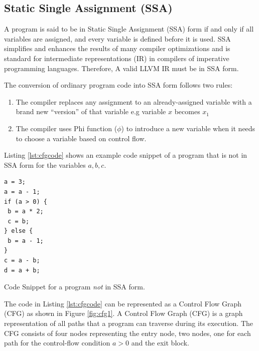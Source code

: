 \subsection{Static Single Assignment (SSA)}
A program is said to be in Static Single Assignment (SSA) \cite{ssa} form if and only if all variables are assigned, and every variable is defined before it is used. SSA simplifies and enhances the results of many compiler optimizations and is standard for intermediate representations (IR) in compilers of imperative programming languages. Therefore, A valid LLVM IR must be in SSA form.

\noindent The conversion of ordinary program code into SSA form follows two rules:
\begin{enumerate}
    \item The compiler replaces any assignment to an already-assigned variable with a brand new “version” of that variable e.g variable \texttt{\textbf{$x$}} becomes \texttt{\textbf{$x_1$}}
    \item The compiler uses Phi function ($\phi$) to introduce a new variable when it needs to choose a variable based on control flow.
\end{enumerate}

Listing \ref{lst:cfgcode} shows an example code snippet of a program that is not in SSA form for the variables $a, b, c$.

\begin{listing}[htbp]
\begin{verbatim}
a = 3;
a = a - 1;
if (a > 0) {
 b = a * 2;
 c = b;
} else {
 b = a - 1;
}
c = a - b;
d = a + b;
\end{verbatim}
\caption{Code Snippet for a program \textit{not} in SSA form.}
\label{lst:cfgcode}
\end{listing}

The code in Listing \ref{lst:cfgcode} can be represented as a Control Flow Graph (CFG) as shown in Figure \ref{fig:cfg1}. A Control Flow Graph (CFG) is a graph representation of all paths that a program can traverse during its execution. The CFG consists of four nodes representing the entry node, two nodes, one for each path for the control-flow condition $a > 0$ and the exit block.



